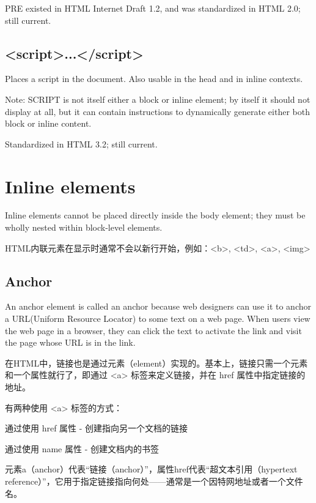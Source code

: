 PRE existed in HTML Internet Draft 1.2, and was standardized in HTML 2.0; still current.



\subsection{<script>...</script>}

Places a script in the document. Also usable in the head and in inline contexts.

Note: SCRIPT is not itself either a block or inline element; by itself it should not display at all, but it can contain instructions to dynamically generate either both block or inline content.

Standardized in HTML 3.2; still current.


\section{Inline elements}

Inline elements cannot be placed directly inside the body element; they must be wholly nested within block-level elements.

HTML内联元素在显示时通常不会以新行开始，例如：<b>, <td>, <a>, <img>


\subsection{Anchor}

An anchor element is called an anchor because web designers can use it to anchor a URL(Uniform Resource Locator) to some text on a web page. When users view the web page in a browser, they can click the text to activate the link and visit the page whose URL is in the link.

在HTML中，链接也是通过元素（element）实现的。基本上，链接只需一个元素和一个属性就行了，即通过 <a> 标签来定义链接，并在 href 属性中指定链接的地址。

有两种使用 <a> 标签的方式：

\begin{compactitem}
\item 通过使用 href 属性 - 创建指向另一个文档的链接
\item 通过使用 name 属性 - 创建文档内的书签
\end{compactitem}

元素a（anchor）代表“链接（anchor）”，属性href代表“超文本引用（hypertext reference）”，它用于指定链接指向何处——通常是一个因特网地址或者一个文件名。



